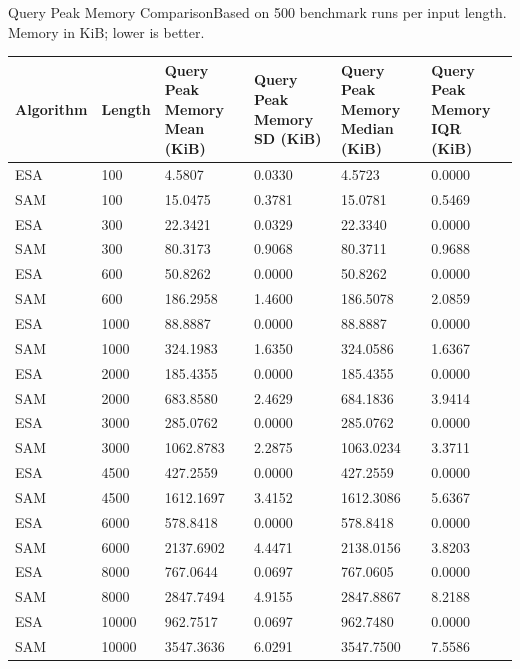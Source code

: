 \begin{benchmarktable}{Query Peak Memory Comparison}{Based on 500 benchmark runs per input length. Memory in KiB; lower is better.}
\begin{tabularx}{\textwidth}{|X|X|X|X|X|X|}
\toprule
Algorithm & Length & Query Peak Memory Mean (KiB) & Query Peak Memory SD (KiB) & Query Peak Memory Median (KiB) & Query Peak Memory IQR (KiB) \\
\midrule
ESA & 100 & 4.5807 & 0.0330 & 4.5723 & 0.0000 \\
SAM & 100 & 15.0475 & 0.3781 & 15.0781 & 0.5469 \\
\hline
ESA & 300 & 22.3421 & 0.0329 & 22.3340 & 0.0000 \\
SAM & 300 & 80.3173 & 0.9068 & 80.3711 & 0.9688 \\
\hline
ESA & 600 & 50.8262 & 0.0000 & 50.8262 & 0.0000 \\
SAM & 600 & 186.2958 & 1.4600 & 186.5078 & 2.0859 \\
\hline
ESA & 1000 & 88.8887 & 0.0000 & 88.8887 & 0.0000 \\
SAM & 1000 & 324.1983 & 1.6350 & 324.0586 & 1.6367 \\
\hline
ESA & 2000 & 185.4355 & 0.0000 & 185.4355 & 0.0000 \\
SAM & 2000 & 683.8580 & 2.4629 & 684.1836 & 3.9414 \\
\hline
ESA & 3000 & 285.0762 & 0.0000 & 285.0762 & 0.0000 \\
SAM & 3000 & 1062.8783 & 2.2875 & 1063.0234 & 3.3711 \\
\hline
ESA & 4500 & 427.2559 & 0.0000 & 427.2559 & 0.0000 \\
SAM & 4500 & 1612.1697 & 3.4152 & 1612.3086 & 5.6367 \\
\hline
ESA & 6000 & 578.8418 & 0.0000 & 578.8418 & 0.0000 \\
SAM & 6000 & 2137.6902 & 4.4471 & 2138.0156 & 3.8203 \\
\hline
ESA & 8000 & 767.0644 & 0.0697 & 767.0605 & 0.0000 \\
SAM & 8000 & 2847.7494 & 4.9155 & 2847.8867 & 8.2188 \\
\hline
ESA & 10000 & 962.7517 & 0.0697 & 962.7480 & 0.0000 \\
SAM & 10000 & 3547.3636 & 6.0291 & 3547.7500 & 7.5586 \\
\bottomrule
\end{tabularx}
\end{benchmarktable}

